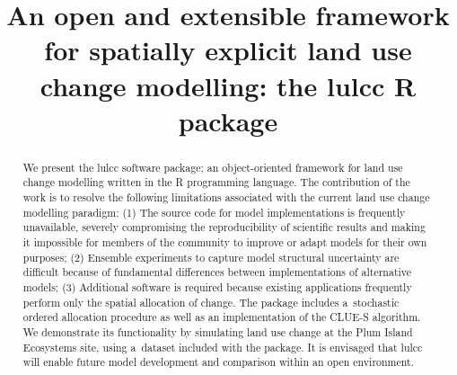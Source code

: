 \documentclass[gmdd, online, hvmath]{copernicus}
\begin{document}
\hack{\sloppy}

\linenumbers

\title{An open and extensible framework for spatially explicit land use change modelling: the lulcc R package}








\published{}


\maketitle

\begin{abstract}
  We present the lulcc software package; an object-oriented framework for land use change modelling written in the R programming language. The contribution of the work is to resolve the following limitations associated with the current land use change modelling paradigm: (1) The source code for model implementations is frequently unavailable, severely compromising the reproducibility of scientific results and making it impossible for members of the community to improve or adapt models for their own purposes; (2) Ensemble experiments to capture model structural uncertainty are difficult because of fundamental differences between implementations of alternative models; (3) Additional software is required because existing applications frequently perform only the spatial allocation of change. The package includes a~stochastic ordered allocation procedure as well as an implementation of the CLUE-S algorithm. We demonstrate its functionality by simulating land use change at the Plum Island Ecosystems site, using a~dataset included with the package. It is envisaged that lulcc will enable future model development and comparison within an open environment. \\
\end{abstract}

\introduction
\end{document}

